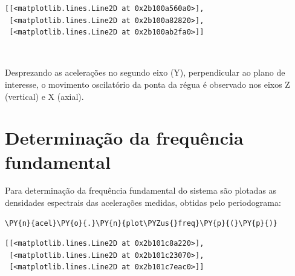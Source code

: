             \begin{tcolorbox}[breakable, size=fbox, boxrule=.5pt, pad at break*=1mm, opacityfill=0]
\begin{Verbatim}[commandchars=\\\{\}]
[[<matplotlib.lines.Line2D at 0x2b100a560a0>],
 [<matplotlib.lines.Line2D at 0x2b100a82820>],
 [<matplotlib.lines.Line2D at 0x2b100ab2fa0>]]
\end{Verbatim}
\end{tcolorbox}
        
    \begin{center}
    \end{center}
    { \hspace*{\fill} \\}
    
    Desprezando as acelerações no segundo eixo (Y), perpendicular ao plano
de interesse, o movimento oscilatório da ponta da régua é observado nos
eixos Z (vertical) e X (axial).

    \hypertarget{determinauxe7uxe3o-da-frequuxeancia-fundamental}{%
\section{Determinação da frequência
fundamental}\label{determinauxe7uxe3o-da-frequuxeancia-fundamental}}

Para determinação da frequência fundamental do sistema são plotadas as
densidades espectrais das acelerações medidas, obtidas pelo
periodograma:

    \begin{tcolorbox}[breakable, size=fbox, boxrule=1pt, pad at break*=1mm,colback=cellbackground, colframe=cellborder]
\begin{Verbatim}[commandchars=\\\{\}]
\PY{n}{acel}\PY{o}{.}\PY{n}{plot\PYZus{}freq}\PY{p}{(}\PY{p}{)}
\end{Verbatim}
\end{tcolorbox}

            \begin{tcolorbox}[breakable, size=fbox, boxrule=.5pt, pad at break*=1mm, opacityfill=0]
\begin{Verbatim}[commandchars=\\\{\}]
[[<matplotlib.lines.Line2D at 0x2b101c8a220>],
 [<matplotlib.lines.Line2D at 0x2b101c23070>],
 [<matplotlib.lines.Line2D at 0x2b101c7eac0>]]
\end{Verbatim}
\end{tcolorbox}
        

